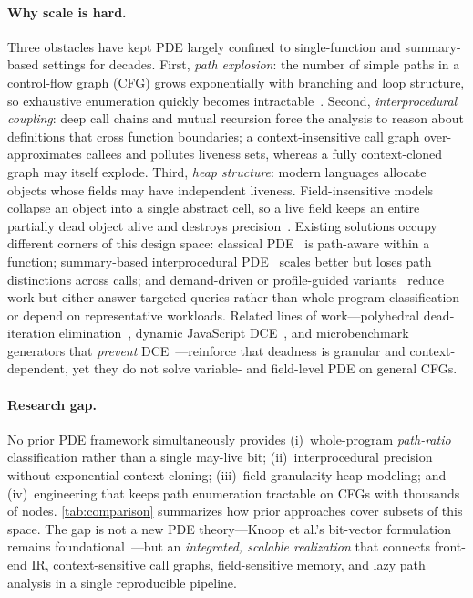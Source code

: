 \documentclass[acmsmall,screen,review,anonymous]{acmart}
\begin{document}
\paragraph{Why scale is hard.}
Three obstacles have kept PDE largely confined to single-function and summary-based settings for decades. First, \emph{path explosion}: the number of simple paths in a control-flow graph (CFG) grows exponentially with branching and loop structure, so exhaustive enumeration quickly becomes intractable~\cite{ball2001slam,henzinger2002blast}. Second, \emph{interprocedural coupling}: deep call chains and mutual recursion force the analysis to reason about definitions that cross function boundaries; a context-insensitive call graph over-approximates callees and pollutes liveness sets, whereas a fully context-cloned graph may itself explode. Third, \emph{heap structure}: modern languages allocate objects whose fields may have independent liveness. Field-insensitive models collapse an object into a single abstract cell, so a live field keeps an entire partially dead object alive and destroys precision~\cite{chatterjee2005interprocedural}. Existing solutions occupy different corners of this design space: classical PDE~\cite{knoop1994partial,bodik1998efficient} is path-aware within a function; summary-based interprocedural PDE~\cite{chatterjee2005interprocedural} scales better but loses path distinctions across calls; and demand-driven or profile-guided variants~\cite{takimoto2012demand,pathprofile2025} reduce work but either answer targeted queries rather than whole-program classification or depend on representative workloads. Related lines of work---polyhedral dead-iteration elimination~\cite{bastoul2025dead}, dynamic JavaScript DCE~\cite{kupoluyi2022muzeel}, and microbenchmark generators that \emph{prevent} DCE~\cite{rodriguez2016autojmh}---reinforce that deadness is granular and context-dependent, yet they do not solve variable- and field-level PDE on general CFGs.

\paragraph{Research gap.}
No prior PDE framework simultaneously provides (i)~whole-program \emph{path-ratio} classification rather than a single may-live bit; (ii)~interprocedural precision without exponential context cloning; (iii)~field-granularity heap modeling; and (iv)~engineering that keeps path enumeration tractable on CFGs with thousands of nodes. \autoref{tab:comparison} summarizes how prior approaches cover subsets of this space. The gap is not a new PDE theory---Knoop et al.'s bit-vector formulation remains foundational~\cite{knoop1994partial}---but an \emph{integrated, scalable realization} that connects front-end IR, context-sensitive call graphs, field-sensitive memory, and lazy path analysis in a single reproducible pipeline.
\end{document}
